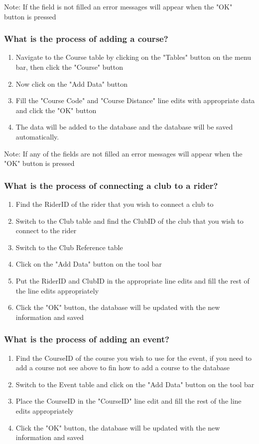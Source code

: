Note: If the field is not filled an error messages will appear when the "OK" button is pressed

\subsubsection{What is the process of adding a course?}
\begin{enumerate}
\item Navigate to the Course table by clicking on the "Tables" button on the menu bar, then click the "Course" button
\item Now click on the "Add Data" button
\item Fill the "Course Code" and "Course Distance" line edits with appropriate data and click the "OK" button
\item The data will be added to the database and the database will be saved automatically.
\end{enumerate}

Note: If any of the fields are not filled an error messages will appear when the "OK" button is pressed

\subsubsection{What is the process of connecting a club to a rider?}
\begin{enumerate}
\item Find the RiderID of the rider that you wish to connect a club to
\item Switch to the Club table and find the ClubID of the club that you wish to connect to the rider
\item Switch to the Club Reference table
\item Click on the "Add Data" button on the tool bar
\item Put the RiderID and ClubID in the appropriate line edits and fill the rest of the line edits appropriately
\item Click the "OK" button, the database will be updated with the new information and saved
\end{enumerate}
\subsubsection{What is the process of adding an event?}
\begin{enumerate}
\item Find the CourseID of the course you wish to use for the event, if you need to add a course not see above to fin how to add a course to the database
\item Switch to the Event table and click on the "Add Data" button on the tool bar
\item Place the CourseID in the "CourseID" line edit and fill the rest of the line edits appropriately
\item Click the "OK" button, the database will be updated with the new information and saved
\end{enumerate}
